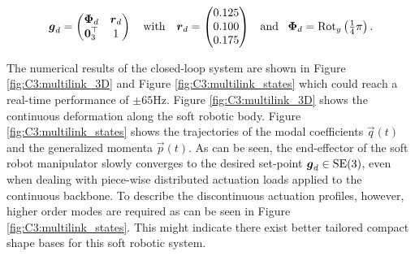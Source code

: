 %
\begin{equation*}
\boldsymbol{g}_d = \begin{pmatrix} \boldsymbol{\Phi}_d & \boldsymbol{r}_d \\ \boldsymbol{0}_3^\top & 1 \end{pmatrix} \quad \text{with} \quad \boldsymbol{r}_d = \begin{pmatrix}  0.125 \\ 0.100 \\ 0.175  \end{pmatrix} \;\;\;\text{and} \;\;\; {\boldsymbol{\Phi}}_d = \textrm{Rot}_y\left(\tfrac{1}{4}\pi \right).
\end{equation*}
%

The numerical results of the closed-loop system are shown in Figure \ref{fig:C3:multilink_3D} and Figure \ref{fig:C3:multilink_states} which could reach a real-time performance of $\pm65$Hz. Figure \ref{fig:C3:multilink_3D} shows the continuous deformation along the soft robotic body. Figure \ref{fig:C3:multilink_states} shows the trajectories of the modal coefficients $\vec{q}(t)$ and the generalized momenta $\vec{p}(t)$. As can be seen, the end-effector of the soft robot manipulator slowly converges to the desired set-point $\boldsymbol{g}_d \in \textup{\textrm{SE}}(3)$, even when dealing with piece-wise distributed actuation loads applied to the continuous backbone. To describe the discontinuous actuation profiles, however, higher order modes are required as can be seen in Figure \ref{fig:C3:multilink_states}. This might indicate there exist better tailored compact shape bases for this soft robotic system.
%
